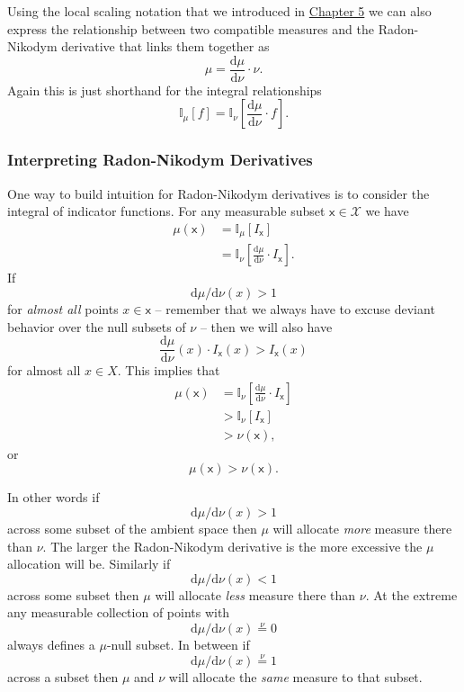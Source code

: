 \documentclass[
  letterpaper,
  DIV=11,
  numbers=noendperiod]{scrartcl}
\begin{document}
Using the local scaling notation that we introduced in
\href{https://betanalpha.github.io/assets/chapters_html/expectation_values.html}{Chapter
5} we can also express the relationship between two compatible measures
and the Radon-Nikodym derivative that links them together as \[
\mu = \frac{ \mathrm{d} \mu }{ \mathrm{d} \nu } \cdot \nu.
\] Again this is just shorthand for the integral relationships \[
\mathbb{I}_{\mu}[f] =
\mathbb{I}_{\nu} \left[
\frac{ \mathrm{d} \mu }{ \mathrm{d} \nu } \cdot f
\right].
\]

\hypertarget{interpreting-radon-nikodym-derivatives}{%
\subsubsection{Interpreting Radon-Nikodym
Derivatives}\label{interpreting-radon-nikodym-derivatives}}

One way to build intuition for Radon-Nikodym derivatives is to consider
the integral of indicator functions. For any measurable subset
\(\mathsf{x} \in \mathcal{X}\) we have \begin{align*}
\mu( \mathsf{x} )
&=
\mathbb{I}_{\mu} [ I_{\mathsf{x}} ]
\\
&=
\mathbb{I}_{\nu} \left[
\frac{ \mathrm{d} \mu }{ \mathrm{d} \nu } \cdot I_{\mathsf{x}} \right].
\end{align*} If \[
\mathrm{d} \mu / \mathrm{d} \nu(x) > 1
\] for \emph{almost all} points \(x \in \mathsf{x}\) -- remember that we
always have to excuse deviant behavior over the null subsets of \(\nu\)
-- then we will also have \[
\frac{ \mathrm{d} \mu }{ \mathrm{d} \nu }(x) \cdot I_{\mathsf{x}}(x)
> I_{\mathsf{x}}(x)
\] for almost all \(x \in X\). This implies that \begin{align*}
\mu( \mathsf{x} )
&=
\mathbb{I}_{\nu} \left[
\frac{ \mathrm{d} \mu }{ \mathrm{d} \nu } \cdot I_{\mathsf{x}} \right]
\\
&>
\mathbb{I}_{\nu} \left[ I_{\mathsf{x}} \right]
\\
&>
\nu(\mathsf{x}),
\end{align*} or \[
\mu( \mathsf{x} ) > \nu( \mathsf{x} ).
\]

In other words if \[
\mathrm{d} \mu / \mathrm{d} \nu(x) > 1
\] across some subset of the ambient space then \(\mu\) will allocate
\emph{more} measure there than \(\nu\). The larger the Radon-Nikodym
derivative is the more excessive the \(\mu\) allocation will be.
Similarly if \[
\mathrm{d} \mu / \mathrm{d} \nu(x) < 1
\] across some subset then \(\mu\) will allocate \emph{less} measure
there than \(\nu\). At the extreme any measurable collection of points
with \[
\mathrm{d} \mu / \mathrm{d} \nu(x) \overset{\nu}{=} 0
\] always defines a \(\mu\)-null subset. In between if \[
\mathrm{d} \mu / \mathrm{d} \nu(x) \overset{\nu}{=} 1
\] across a subset then \(\mu\) and \(\nu\) will allocate the
\emph{same} measure to that subset.
\end{document}
